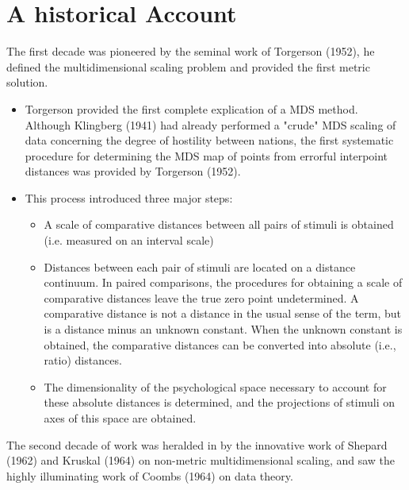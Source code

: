 \documentclass[11pt]{report}
\begin{document}
\section{A historical Account}
The first decade was pioneered by the seminal work of Torgerson (1952), he 
defined the multidimensional scaling problem and provided the first metric 
solution. 

\begin{itemize}
\item Torgerson\cite{Torgerson1952} provided the first complete explication 
of a MDS method. Although Klingberg (1941) had already performed a "crude" 
MDS scaling of data concerning the degree of hostility between nations, the 
first systematic procedure for determining the MDS map of points from 
errorful interpoint distances was provided by Torgerson (1952)\cite{Torgerson1952}.

\item This process introduced three major steps:

\begin{itemize}

\item A scale of comparative distances between all pairs of stimuli is obtained 
(i.e. measured on an interval scale)

\item Distances between each pair of stimuli are located on a distance continuum.
In paired comparisons, the procedures for obtaining a scale of comparative 
distances leave the true zero point undetermined. A comparative distance is 
not a distance in the usual sense of the term, but is a distance minus an 
unknown constant. When the unknown constant is obtained, the comparative 
distances can be converted into absolute (i.e., ratio) distances. 

\item The dimensionality of the psychological space necessary to account for 
these absolute distances is determined, and the projections of stimuli on 
axes of this space are obtained.

\end{itemize}
\end{itemize}
 
\indent The second decade of work was heralded in by the innovative work of 
Shepard (1962)\cite{Shepard1962} and Kruskal (1964)\cite{Kruskal1964} on 
non-metric multidimensional scaling, and saw the highly illuminating work of 
Coombs (1964)\cite{coombs} on data theory. 
\end{document}
